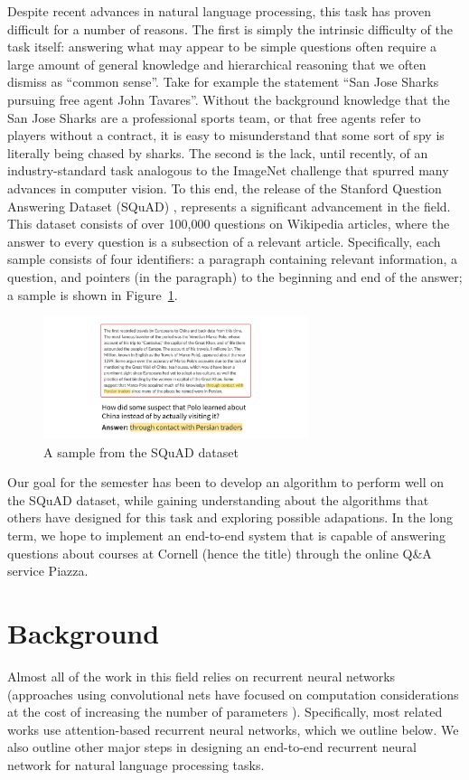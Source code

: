 \documentclass{article}
\begin{document}
Despite recent advances in natural language processing, this task has proven difficult for a number of reasons. The first is simply the intrinsic difficulty of the task itself: answering what may appear to be simple questions often require a large amount of general knowledge and hierarchical reasoning that we often dismiss as ``common sense''. Take for example the statement ``San Jose Sharks pursuing free agent John Tavares''. Without the background knowledge that the San Jose Sharks are a professional sports team, or that free agents refer to players without a contract, it is easy to misunderstand that some sort of spy is literally being chased by sharks. The second is the lack, until recently, of an industry-standard task analogous to the ImageNet challenge that spurred many advances in computer vision. To this end, the release of the Stanford Question Answering Dataset (SQuAD) \cite{SQuAD}, represents a significant advancement in the field. This dataset consists of over 100,000 questions on Wikipedia articles, where the answer to every question is a subsection of a relevant article. Specifically, each sample consists of four identifiers: a paragraph containing relevant information, a question, and pointers (in the paragraph) to the beginning and end of the answer; a sample is shown in Figure~\ref{fig:squadExample}.

\begin{figure}[h]
	\includegraphics[width=0.69\textwidth]{squad_example.png}
	\centering
	\caption{A sample from the SQuAD dataset}
	\label{fig:squadExample}
\end{figure}

Our goal for the semester has been to develop an algorithm to perform well on the SQuAD dataset, while gaining understanding about the algorithms that others have designed for this task and exploring possible adapations. In the long term, we hope to implement an end-to-end system that is capable of answering questions about courses at Cornell (hence the title) through the online Q\&A service Piazza. 

\section{Background} \label{background}
Almost all of the work in this field relies on recurrent neural networks (approaches using convolutional nets have focused on computation considerations at the cost of increasing the number of parameters \cite{CNN_QA}). Specifically, most related works use attention-based recurrent neural networks, which we outline below. We also outline other major steps in designing an end-to-end recurrent neural network for natural language processing tasks.
\end{document}
